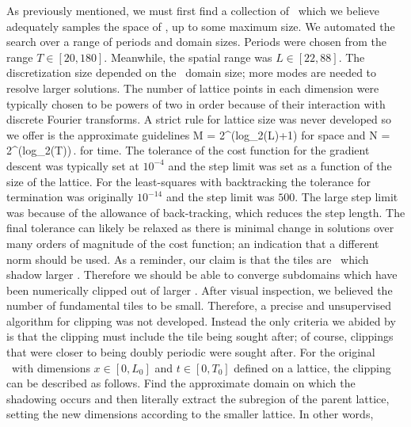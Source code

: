 As previously mentioned, we must first find a collection of \twots\ which we believe
adequately samples the space of \twots, up to some maximum size. We automated the search over a range
of periods and domain sizes. Periods were chosen from the range
$T\in [20, 180]$. Meanwhile, the spatial range was $L \in [22, 88]$. The discretization size
depended on the \spt\ domain size; more modes are needed to resolve larger solutions. The number
of lattice points in each dimension were typically chosen to be powers of two in order because of their interaction with discrete Fourier transforms. A strict rule for lattice size
was never developed so we offer is the approximate guidelines
\beq
M = 2^{(log_2(L)+1)}
\eeq
for space and
\beq
N = 2^{(log_2(T))}\,.
\eeq
for time.
The tolerance of the cost function for the gradient descent was typically set at $10^{-4}$
and the step limit was set as a function of the size of the lattice. For the least-squares
with backtracking the tolerance for termination was originally $10^{-14}$ and the step limit was $500$. The large step limit was because of
the allowance of back-tracking, which reduces the step length.
The final tolerance can likely be relaxed as there is minimal change in solutions over many orders
of magnitude of the cost function; an indication that a different norm should be used.
As a reminder, our claim is that the tiles are \twots\ which shadow larger \twots.
Therefore we should be able to converge subdomains which have been numerically clipped out
of larger \twots. After visual inspection, we believed the number of fundamental tiles to
be small. Therefore, a precise and unsupervised algorithm for clipping was not developed.
Instead the only criteria we abided by is that the clipping must include the tile being
sought after; of course, clippings that were closer to being doubly periodic were sought after.
For the original \twot\ with dimensions $x \in [0, L_0]$ and $t \in [0, T_0]$ defined on a lattice, the
clipping can be described as follows. Find the approximate domain on which
the shadowing occurs and then literally extract the subregion of the parent lattice,
setting the new {\spt} dimensions according to the smaller lattice. In other words,
